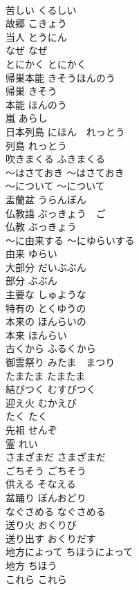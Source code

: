 \documentclass[8pt]{extreport}
\begin{document}
\begin{CJK}{UTF8}{min}
\\	苦しい	くるしい	
\\	故郷	こきょう	
\\	当人	とうにん	
\\	なぜ	なぜ	
\\	とにかく	とにかく	
\\	帰巣本能	きそうほんのう	
\\	帰巣	きそう	
\\	本能	ほんのう	
\\	嵐	あらし	
\\	日本列島	にほん　れっとう	
\\	列島	れっとう	
\\	吹きまくる	ふきまくる	
\\	〜はさておき	〜はさておき	
\\	〜について	〜について	
\\	盂蘭盆	うらんぼん	
\\	仏教語	ぶっきょう　ご	
\\	仏教	ぶっきょう	
\\	〜に由来する	〜にゆらいする	
\\	由来	ゆらい	
\\	大部分	だいぶぶん	
\\	部分	ぶぶん	
\\	主要な	しゅような	
\\	特有の	とくゆうの	
\\	本来の	ほんらいの	
\\	本来	ほんらい	
\\	古くから	ふるくから	
\\	御霊祭り	みたま　まつり	
\\	たまたま	たまたま	
\\	結びつく	むすびつく	
\\	迎え火	むかえび	
\\	たく	たく	
\\	先祖	せんぞ	
\\	霊	れい	
\\	さまざまだ	さまざまだ	
\\	ごちそう	ごちそう	
\\	供える	そなえる	
\\	盆踊り	ぼんおどり	
\\	なぐさめる	なぐさめる	
\\	送り火	おくりび	
\\	送り出す	おくりだす	
\\	地方によって	ちほうによって	
\\	地方	ちほう	
\\	これら	これら	

\end{CJK}
\end{document}
